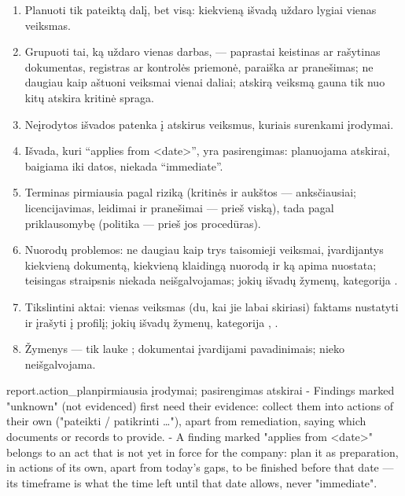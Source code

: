 \begin{enumerate}[itemsep=1pt, topsep=3pt]
  \item Planuoti tik pateiktą dalį, bet visą: kiekvieną išvadą uždaro lygiai vienas veiksmas.
  \item Grupuoti tai, ką uždaro vienas darbas, --- paprastai keistinas ar rašytinas dokumentas,
    registras ar kontrolės priemonė, paraiška ar pranešimas; ne daugiau kaip aštuoni veiksmai
    vienai daliai; atskirą veiksmą gauna tik nuo kitų atskira kritinė spraga.
  \item Neįrodytos išvados patenka į atskirus veiksmus, kuriais surenkami įrodymai.
  \item Išvada, kuri \enquote{applies from <date>}, yra pasirengimas: planuojama atskirai,
    baigiama iki datos, niekada \enquote{immediate}.
  \item Terminas pirmiausia pagal riziką (kritinės ir aukštos --- anksčiausiai; licencijavimas,
    leidimai ir pranešimai --- prieš viską), tada pagal priklausomybę (politika --- prieš jos
    procedūras).
  \item Nuorodų problemos: ne daugiau kaip trys taisomieji veiksmai, įvardijantys kiekvieną
    dokumentą, kiekvieną klaidingą nuorodą ir ką apima nuostata; teisingas straipsnis niekada
    neišgalvojamas; jokių išvadų žymenų, kategorija .
  \item Tikslintini aktai: vienas veiksmas (du, kai jie labai skiriasi) faktams nustatyti ir
    įrašyti į profilį; jokių išvadų žymenų, kategorija , .
  \item Žymenys --- tik lauke ; dokumentai įvardijami pavadinimais; nieko
    neišgalvojama.
\end{enumerate}

\par\nopagebreak
\begin{promptexcerpt}{report.action_plan}{pirmiausia įrodymai; pasirengimas atskirai}
- Findings marked "unknown" (not evidenced) first need their evidence: collect them
  into actions of their own ("pateikti / patikrinti …"), apart from remediation,
  saying which documents or records to provide.
- A finding marked "applies from <date>" belongs to an act that is not yet in force
  for the company: plan it as preparation, in actions of its own, apart from today's
  gaps, to be finished before that date — its timeframe is what the time left until
  that date allows, never "immediate".
\end{promptexcerpt}

